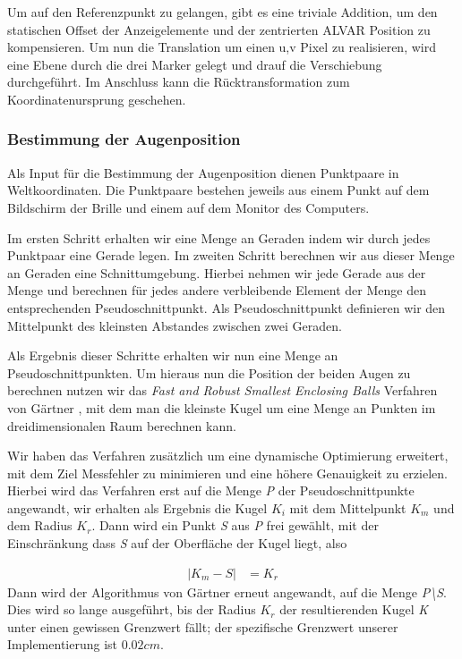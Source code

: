 Um auf den Referenzpunkt zu gelangen, gibt es eine triviale Addition, um den statischen Offset der Anzeigelemente und der zentrierten ALVAR Position zu kompensieren. 
Um nun die Translation um einen u,v Pixel zu realisieren, wird eine Ebene durch die drei Marker gelegt und drauf die Verschiebung durchgeführt. 
Im Anschluss kann die Rücktransformation zum Koordinatenursprung geschehen.


\subsubsection{Bestimmung der Augenposition}
\label{sec:Augenposition}
Als Input für die Bestimmung der Augenposition dienen Punktpaare in Weltkoordinaten. Die Punktpaare bestehen jeweils aus einem Punkt auf dem Bildschirm der Brille und einem auf dem Monitor des Computers.

Im ersten Schritt erhalten wir eine Menge an Geraden indem wir durch jedes Punktpaar eine Gerade legen. Im zweiten Schritt berechnen wir aus dieser Menge an Geraden eine Schnittumgebung. Hierbei nehmen wir jede Gerade aus der Menge und berechnen für jedes andere verbleibende Element der Menge den entsprechenden Pseudoschnittpunkt. Als Pseudoschnittpunkt definieren wir den      Mittelpunkt des kleinsten Abstandes zwischen zwei Geraden.

Als Ergebnis dieser Schritte erhalten wir nun eine Menge an Pseudoschnittpunkten. Um hieraus nun die Position der beiden Augen zu berechnen nutzen wir das \emph{Fast and Robust Smallest Enclosing Balls} Verfahren von Gärtner \cite{gaertner}, mit dem man die kleinste Kugel um eine Menge an Punkten im dreidimensionalen Raum berechnen kann.

Wir haben das Verfahren zusätzlich um eine dynamische Optimierung erweitert, mit dem Ziel
Messfehler zu minimieren und eine höhere Genauigkeit zu erzielen.\\ 

Hierbei wird das Verfahren erst auf die Menge \emph{P} der Pseudoschnittpunkte angewandt, wir erhalten als Ergebnis die Kugel $K_i$ mit  dem Mittelpunkt $K_m$ und dem Radius $K_r$. Dann wird ein Punkt \emph{S} aus \emph{P} frei gewählt, mit der Einschränkung dass \emph{S} auf der Oberfläche der Kugel liegt, also 

\begin{align}
| K_m - S | &= K_r
\end{align} Dann wird der Algorithmus von Gärtner erneut angewandt, auf die Menge \emph{P\textbackslash S}. Dies wird so lange ausgeführt, bis
der Radius $K_r$ der resultierenden Kugel \emph{K} unter einen gewissen Grenzwert fällt; der spezifische Grenzwert unserer Implementierung ist $0.02 cm$.

